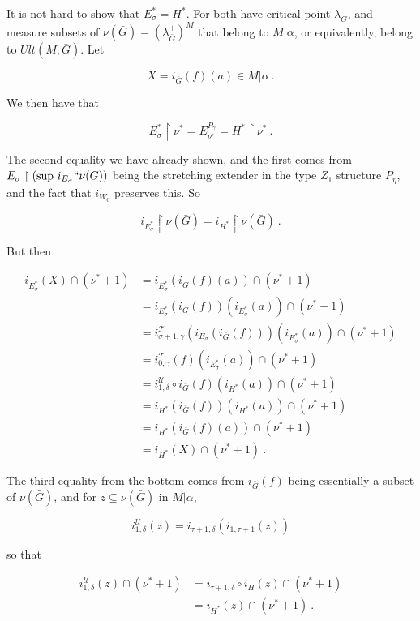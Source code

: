 \documentclass[12pt]{article}
\begin{document}
It is not hard to show that $E_\sigma^* = H^*$.  For both have critical point $\lambda_{\bar{G}}$, and measure subsets of $\nu(\bar{G}) = (\lambda_{\bar{G}}^+)^M$ that belong to $M | \alpha$, or equivalently, belong to $Ult (M , \bar{G})$.  Let

\[
X = i_{\bar{G}}(f)(a) \in M| \alpha \ .
\]

We then have that

\[
E_\sigma^* \restriction \nu^* = E_{\nu^*}^{P_\gamma} = H^* \restriction \nu^* \ .
\]

The second equality we have already shown, and the first comes from $E_\sigma \restriction (\text{sup } i_{E_\sigma} `` \nu(\bar{G}))$ being the stretching extender in the type $Z_1$ structure $P_\eta$, and the fact that $i_{W_0}$ preserves this.  So

\[
i_{E_\sigma^*} \restriction \nu (\bar{G}) = i_{H^*} \restriction \nu (\bar{G}) \ .
\]

But then

\[
\begin{split}
i_{E_\sigma^*} (X) \cap (\nu^* + 1 ) & = i_{E_\sigma^*} (i_{\bar{G}} (f)(a)) \cap (\nu^* + 1)\\
& = i_{E_\sigma^*} (i_{\bar{G}}(f)) (i_{E_\sigma^*}(a)) \cap (\nu^* + 1)\\
& = i_{\sigma + 1 , \gamma}^{\mathscr{T}} (i_{E_\sigma} ( i_{\bar{G}} (f)))(i_{E_\sigma^*}(a)) \cap (\nu^* + 1)\\
& = i_{0, \gamma}^{\mathscr{T}}(f)(i_{E_\sigma^*}(a)) \cap (\nu^* + 1)\\
& = i_{1, \delta}^{\mathscr{U}} \circ i_{\bar{G}}(f)(i_{H^*}(a)) \cap (\nu^* + 1)\\
& = i_{H^*}(i_{\bar{G}}(f))(i_{H^*}(a)) \cap (\nu^* + 1)\\
& = i_{H^*} (i_{\bar{G}}(f)(a)) \cap (\nu^* + 1)\\
& = i_{H^*} (X) \cap (\nu^* + 1) \ .
\end{split}
\]

The third equality from the bottom comes from $i_{\bar{G}} (f)$ being essentially a subset of $\nu (\bar{G})$, and for $z \subseteq \nu(\bar{G})$ in $M | \alpha$,

\[
i_{1, \delta}^{\mathscr{U}} (z) = i_{\tau + 1 , \delta} (i_{1, \tau + 1 }(z))
\]

so that

\[
\begin{split}
i_{1, \delta}^{\mathscr{U}} (z) \cap (\nu^* + 1) & = i_{\tau + 1 , \delta } \circ i_H (z) \cap (\nu^* + 1)\\
& = i_{H^*} (z) \cap (\nu^* + 1 ) \ .
\end{split}
\]
\end{document}

